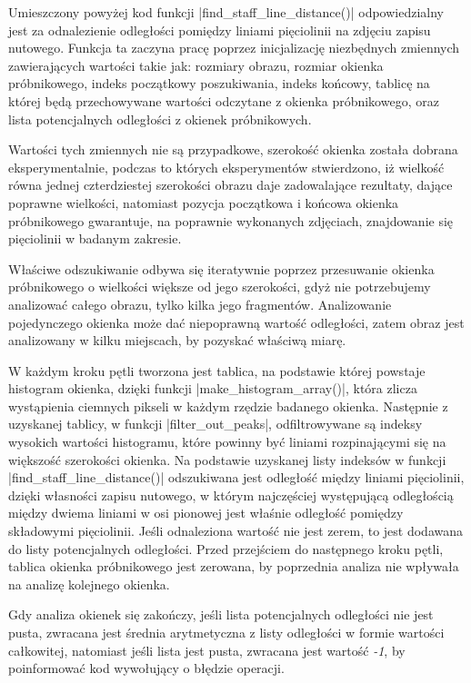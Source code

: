 Umieszczony powyżej kod funkcji \pyth|find_staff_line_distance()| odpowiedzialny jest za odnalezienie odległości pomiędzy liniami pięciolinii na zdjęciu zapisu nutowego. Funkcja ta zaczyna pracę poprzez inicjalizację niezbędnych zmiennych zawierających wartości takie jak: rozmiary obrazu, rozmiar okienka próbnikowego, indeks początkowy poszukiwania, indeks końcowy, tablicę na której będą przechowywane wartości odczytane z okienka próbnikowego, oraz lista potencjalnych odległości z okienek próbnikowych.

Wartości tych zmiennych nie są przypadkowe, szerokość okienka została dobrana eksperymentalnie, podczas to których eksperymentów stwierdzono, iż wielkość równa jednej czterdziestej szerokości obrazu daje zadowalające rezultaty, dające poprawne wielkości, natomiast pozycja początkowa i końcowa okienka próbnikowego gwarantuje, na poprawnie wykonanych zdjęciach, znajdowanie się pięciolinii w badanym zakresie.

Właściwe odszukiwanie odbywa się iteratywnie poprzez przesuwanie okienka próbnikowego o wielkości większe od jego szerokości, gdyż nie potrzebujemy analizować całego obrazu, tylko kilka jego fragmentów. Analizowanie pojedynczego okienka może dać niepoprawną wartość odległości, zatem obraz jest analizowany w kilku miejscach, by pozyskać właściwą miarę.

W każdym kroku pętli tworzona jest tablica, na podstawie której powstaje histogram okienka, dzięki funkcji \pyth|make_histogram_array()|, która zlicza wystąpienia ciemnych pikseli w  każdym rzędzie badanego okienka. Następnie z uzyskanej tablicy, w funkcji \pyth|filter_out_peaks|, odfiltrowywane są indeksy wysokich wartości histogramu, które powinny być liniami rozpinającymi się na większość szerokości okienka. Na podstawie uzyskanej listy indeksów w funkcji \pyth|find_staff_line_distance()| odszukiwana jest odległość między liniami pięciolinii, dzięki własności zapisu nutowego, w którym najczęściej występującą odległością między dwiema liniami w osi pionowej jest właśnie odległość pomiędzy składowymi pięciolinii. Jeśli odnaleziona wartość nie jest zerem, to jest dodawana do listy potencjalnych odległości. Przed przejściem do następnego kroku pętli, tablica okienka próbnikowego jest zerowana, by poprzednia analiza nie wpływała na analizę kolejnego okienka.

Gdy analiza okienek się zakończy, jeśli lista potencjalnych odległości nie jest pusta, zwracana jest średnia arytmetyczna z listy odległości w formie wartości całkowitej, natomiast jeśli lista jest pusta, zwracana jest wartość \textit{-1}, by poinformować kod wywołujący o błędzie operacji.



